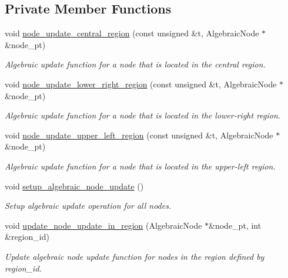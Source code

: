 \subsection*{Private Member Functions}
\begin{DoxyCompactItemize}
\item 
void \hyperlink{classoomph_1_1AlgebraicRefineableQuarterTubeMesh_a064653020f5d2a0c7de789283dac305c}{node\+\_\+update\+\_\+central\+\_\+region} (const unsigned \&t, Algebraic\+Node $\ast$\&node\+\_\+pt)
\begin{DoxyCompactList}\small\item\em Algebraic update function for a node that is located in the central region. \end{DoxyCompactList}\item 
void \hyperlink{classoomph_1_1AlgebraicRefineableQuarterTubeMesh_a52fb1161ebff25b5c638ac35cb541817}{node\+\_\+update\+\_\+lower\+\_\+right\+\_\+region} (const unsigned \&t, Algebraic\+Node $\ast$\&node\+\_\+pt)
\begin{DoxyCompactList}\small\item\em Algebraic update function for a node that is located in the lower-\/right region. \end{DoxyCompactList}\item 
void \hyperlink{classoomph_1_1AlgebraicRefineableQuarterTubeMesh_ac82a39ccaed8016a9b1e841d91658a75}{node\+\_\+update\+\_\+upper\+\_\+left\+\_\+region} (const unsigned \&t, Algebraic\+Node $\ast$\&node\+\_\+pt)
\begin{DoxyCompactList}\small\item\em Algebraic update function for a node that is located in the upper-\/left region. \end{DoxyCompactList}\item 
void \hyperlink{classoomph_1_1AlgebraicRefineableQuarterTubeMesh_a2d0312615834a2aec8d0d6d4e2c846ef}{setup\+\_\+algebraic\+\_\+node\+\_\+update} ()
\begin{DoxyCompactList}\small\item\em Setup algebraic update operation for all nodes. \end{DoxyCompactList}\item 
void \hyperlink{classoomph_1_1AlgebraicRefineableQuarterTubeMesh_ae2014e91ad7f5a226b35aa96964f4bf1}{update\+\_\+node\+\_\+update\+\_\+in\+\_\+region} (Algebraic\+Node $\ast$\&node\+\_\+pt, int \&region\+\_\+id)
\begin{DoxyCompactList}\small\item\em Update algebraic node update function for nodes in the region defined by region\+\_\+id. \end{DoxyCompactList}\end{DoxyCompactItemize}
